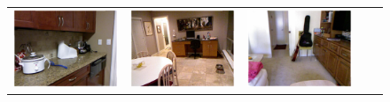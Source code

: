 \documentclass[a4paper, 10pt, conference]{ieeeconf}      %
\begin{document}
\begin{figure}
    \begin{tabu} to 
    \includegraphics[width=\linewidth]{images/00845_image.png}&%
    \includegraphics[width=\linewidth]{images/00781_image.png}&%
    \includegraphics[width=\linewidth]{images/01331_image.png}&%

\end{tabu}
\end{figure}
\end{document}
